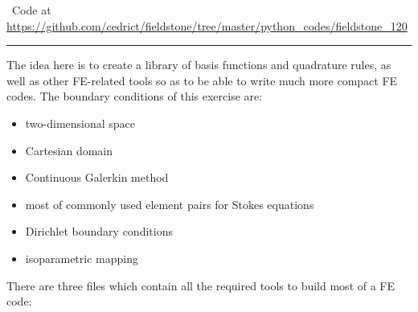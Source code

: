 %

\begin{center}
\inpython~Code at \url{https://github.com/cedrict/fieldstone/tree/master/python_codes/fieldstone_120}
\end{center}

\par\noindent\rule{\textwidth}{0.4pt}


The idea here is to create a library of basis functions and quadrature rules, as well as 
other FE-related tools so as to be able to write much more compact FE codes. 
The boundary conditions of this exercise are:
\begin{itemize}
\item two-dimensional space
\item Cartesian domain
\item Continuous Galerkin method
\item most of commonly used element pairs for Stokes equations 
\item Dirichlet boundary conditions 
\item isoparametric mapping
\end{itemize}

There are three files which contain all the required tools to build most of a FE code:

